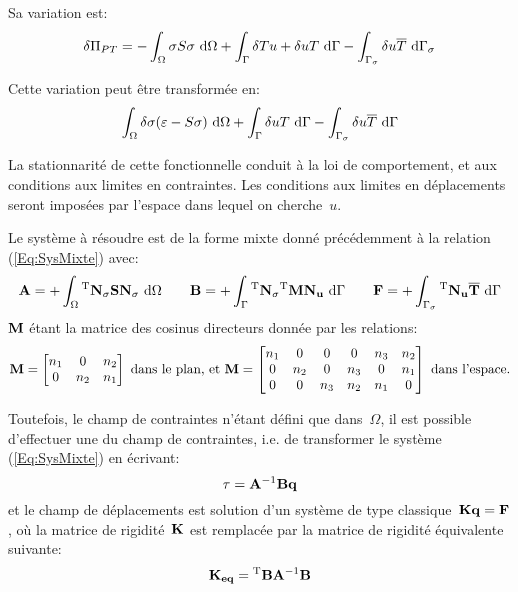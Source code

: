 \medskip
Sa variation est:
\begin{equation}
  \label{Eq:deltaPiPT}
  \delta\Pi_{PT} =
    -\displaystyle\int_{\Omega} \sigma S\sigma\ \text{d}\Omega
    +\displaystyle\int_{\Gamma} \delta Tu+\delta uT\ \text{d}\Gamma
    -\displaystyle\int_{\Gamma_\sigma} \delta u \overline{T}\ \text{d}\Gamma_\sigma
\end{equation}

\medskip
Cette variation peut être transformée en:
\[
  \displaystyle\int_\Omega \delta \sigma (\varepsilon- S\sigma) \ \text{d}\Omega
  +\displaystyle\int_{\Gamma} \delta uT\ \text{d}\Gamma
  -\displaystyle\int_{\Gamma_\sigma} \delta u\overline{T}\ \text{d}\Gamma
\]

\medskip
La stationnarité de cette fonctionnelle conduit à la loi de comportement, et aux conditions aux limites en contraintes. Les conditions aux limites en déplacements seront imposées par l'espace dans lequel on cherche~$u$.

\medskip
Le système à résoudre est de la forme mixte donné précédemment à la relation (\ref{Eq:SysMixte}) avec:
\begin{equation}
  \MM{A} = +\dint_{\Omega} \MMT{N_\sigma}\MM{S}\MM{N_\sigma}\ \dd\Omega
\qquad
  \MM{B} = +\dint_{\Gamma} \MMT{N_\sigma}\MMT{M}\MM{N_u}\ \dd\Gamma
\qquad
  \VV{F} = +\dint_{\ls} \MMT{N_u}\VV{\Tbar} \ \dd\Gamma
\end{equation}
$\MM{M}$ étant la matrice des cosinus directeurs donnée par les relations:
\begin{equation}
  \MM{M}=\MM*{n_1& 0&n_2\\
          0&n_2&n_1}
\text{ dans le plan, et }%
  \MM{M}=\MM*{n_1& 0& 0& 0&n_3&n_2\\
          0&n_2& 0&n_3& 0&n_1\\
          0& 0&n_3&n_2&n_1& 0}
\text{ dans l'espace.}
\end{equation}

\bigskip
Toutefois, le champ de contraintes n'étant défini que dans~$\Omega$, il est possible d'effectuer une  du champ de contraintes, i.e. de transformer le système (\ref{Eq:SysMixte}) en écrivant:
\begin{equation}
  \label{Eq:TauQ}
   \VV{\tau} = \MMI{A}\MM{B}\VV{q}
\end{equation}
et le champ de déplacements est solution d'un système de type classique~$\MM{K}\VV{q}=\VV{F}$, où la matrice de rigidité~$\MM{K}$ est remplacée par la matrice de rigidité équivalente suivante:
\begin{equation}
  \MM{K_{eq}} = \MMT{B}\MMI{A}\MM{B}
\end{equation}


